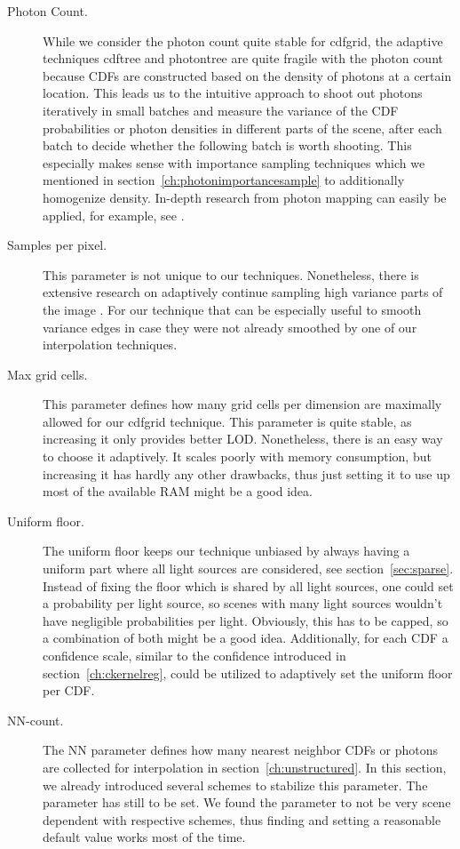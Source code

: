 \begin{description}
    \item[Photon Count.] While we consider the photon count quite stable for cdfgrid, the adaptive techniques cdftree and photontree are quite fragile with the photon count because CDFs are constructed based on the density of photons at a certain location. This leads us to the intuitive approach to shoot out photons iteratively in small batches and measure the variance of the CDF probabilities or photon densities in different parts of the scene, after each batch to decide whether the following batch is worth shooting. This especially makes sense with importance sampling techniques which we mentioned in section~\ref{ch:photonimportancesample} to additionally homogenize density. In-depth research from photon mapping can easily be applied, for example, see \cite{}.
    \item[Samples per pixel.] This parameter is not unique to our techniques. Nonetheless, there is extensive research on adaptively continue sampling high variance parts of the image \cite{}. For our technique that can be especially useful to smooth variance edges in case they were not already smoothed by one of our interpolation techniques.
    \item[Max grid cells.] This parameter defines how many grid cells per dimension are maximally allowed for our cdfgrid technique. This parameter is quite stable, as increasing it only provides better LOD. Nonetheless, there is an easy way to choose it adaptively. It scales poorly with memory consumption, but increasing it has hardly any other drawbacks, thus just setting it to use up most of the available RAM might be a good idea.
    \item[Uniform floor.] The uniform floor keeps our technique unbiased by always having a uniform part where all light sources are considered, see section~\ref{sec:sparse}. Instead of fixing the floor which is shared by all light sources, one could set a probability per light source, so scenes with many light sources wouldn't have negligible probabilities per light. Obviously, this has to be capped, so a combination of both might be a good idea. Additionally, for each CDF a confidence scale, similar to the confidence introduced in section~\ref{ch:ckernelreg}, could be utilized to adaptively set the uniform floor per CDF.
    \item[NN-count.] The NN parameter defines how many nearest neighbor CDFs or photons are collected for interpolation in section~\ref{ch:unstructured}. In this section, we already introduced several schemes to stabilize this parameter. The parameter has still to be set. We found the parameter to not be very scene dependent with respective schemes, thus finding and setting a reasonable default value works most of the time.

\end{description}
